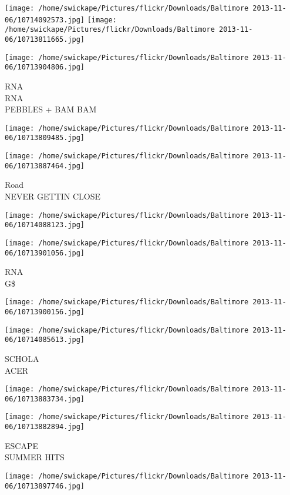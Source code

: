 \documentclass[10pt,letterpaper]{article}
\begin{document}
\texttt{[image: /home/swickape/Pictures/flickr/Downloads/Baltimore 2013-11-06/10714092573.jpg]}
\texttt{[image: /home/swickape/Pictures/flickr/Downloads/Baltimore 2013-11-06/10713811665.jpg]}

\vspace{0.25in}
\texttt{[image: /home/swickape/Pictures/flickr/Downloads/Baltimore 2013-11-06/10713904806.jpg]}

RNA\\
RNA\\
PEBBLES + BAM BAM
\pagebreak

\texttt{[image: /home/swickape/Pictures/flickr/Downloads/Baltimore 2013-11-06/10713809485.jpg]}

\vspace{0.25in}
\texttt{[image: /home/swickape/Pictures/flickr/Downloads/Baltimore 2013-11-06/10713887464.jpg]}

Road\\
NEVER GETTIN CLOSE
\pagebreak

\texttt{[image: /home/swickape/Pictures/flickr/Downloads/Baltimore 2013-11-06/10714088123.jpg]}

\vspace{0.25in}
\texttt{[image: /home/swickape/Pictures/flickr/Downloads/Baltimore 2013-11-06/10713901056.jpg]}

RNA\\
G\$
\pagebreak

\texttt{[image: /home/swickape/Pictures/flickr/Downloads/Baltimore 2013-11-06/10713900156.jpg]}

\vspace{0.25in}
\texttt{[image: /home/swickape/Pictures/flickr/Downloads/Baltimore 2013-11-06/10714085613.jpg]}

SCHOLA\\
ACER
\pagebreak

\texttt{[image: /home/swickape/Pictures/flickr/Downloads/Baltimore 2013-11-06/10713883734.jpg]}

\vspace{0.25in}
\texttt{[image: /home/swickape/Pictures/flickr/Downloads/Baltimore 2013-11-06/10713882894.jpg]}

ESCAPE\\
SUMMER HITS
\pagebreak

\texttt{[image: /home/swickape/Pictures/flickr/Downloads/Baltimore 2013-11-06/10713897746.jpg]}
\end{document}
